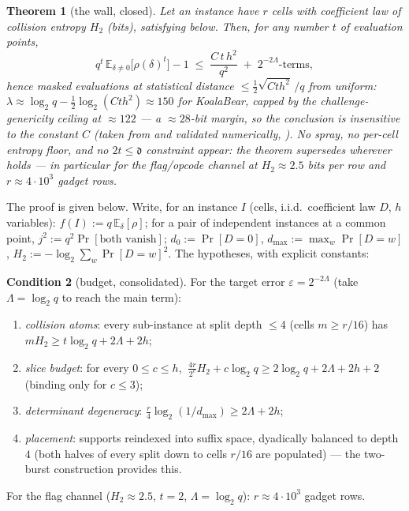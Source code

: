\documentclass{article}
\newcommand{\extdeg}{\mathfrak{d}}
\newtheorem{theorem}{Theorem}[section]
\theoremstyle{definition}
\newtheorem{condition}[theorem]{Condition}
\begin{document}
\begin{theorem}[the wall, closed]\label{thm:wall}
Let an instance have $r$ cells with coefficient law of collision entropy $H_2$ (bits), satisfying  below. Then, for any number $t$ of evaluation points,
\[
q^t\,\mathbb{E}_{\delta \neq 0}\big[\rho(\delta)^t\big] - 1 \;\leq\; \frac{C\,t\,h^2}{q^{2}} \;+\; 2^{-2\Lambda}\text{-terms} ,
\]
hence masked evaluations at statistical distance $\leq \tfrac12\sqrt{Cth^2}\,/q$ from uniform: $\lambda \approx \log_2 q - \tfrac12\log_2(Cth^2) \approx 150$ for KoalaBear, capped by the challenge-genericity ceiling at $\approx 122$ --- a $\approx 28$-bit margin, so the conclusion is insensitive to the constant $C$ (taken from  and validated numerically, ). \emph{No spray, no per-cell entropy floor, and no $2t \leq \extdeg$ constraint appear}: the theorem supersedes  wherever  holds --- in particular for the flag/opcode channel at $H_2 \approx 2.5$ bits per row and $r \approx 4 \cdot 10^3$ gadget rows.
\end{theorem}

The proof is given below. Write, for an instance $I$ (cells, i.i.d.\ coefficient law $D$, $h$ variables): $f(I) := q\,\mathbb{E}_\delta[\rho]$; for a pair of independent instances at a common point, $j^2 := q^2 \Pr[\text{both vanish}]$; $d_0 := \Pr[D = 0]$, $d_{\max} := \max_w \Pr[D = w]$, $H_2 := -\log_2 \sum_w \Pr[D=w]^2$. The hypotheses, with explicit constants:

\begin{condition}[budget, consolidated]\label{cond:budget}
For the target error $\varepsilon = 2^{-2\Lambda}$ (take $\Lambda = \log_2 q$ to reach the main term):
\begin{enumerate}
    \item[\textsc{(c1)}] \emph{collision atoms}: every sub-instance at split depth $\leq 4$ (cells $m \geq r/16$) has $m H_2 \geq t \log_2 q + 2\Lambda + 2h$;
    \item[\textsc{(c2)}] \emph{slice budget}: for every $0 \leq c \leq h$, $\ \tfrac{4r}{2^c} H_2 + c \log_2 q \geq 2\log_2 q + 2\Lambda + 2h + 2$ (binding only for $c \leq 3$);
    \item[\textsc{(c3)}] \emph{determinant degeneracy}: $\tfrac{r}{4}\log_2(1/d_{\max}) \geq 2\Lambda + 2h$;
    \item[\textsc{(c4)}] \emph{placement}: supports reindexed into suffix space, dyadically balanced to depth $4$ (both halves of every split down to cells $r/16$ are populated) --- the two-burst construction provides this.
\end{enumerate}
For the flag channel ($H_2 \approx 2.5$, $t = 2$, $\Lambda = \log_2 q$): $r \approx 4 \cdot 10^3$ gadget rows.
\end{condition}
\end{document}
